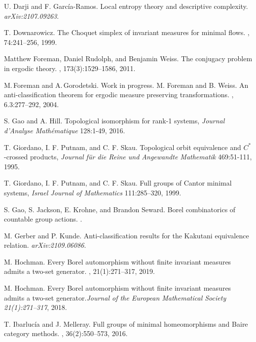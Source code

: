 \documentclass{article}
\theoremstyle{definition}
\begin{document}
\begin{thebibliography}{99}
 U. Darji and F. García-Ramos. Local entropy theory and descriptive complexity. {\em arXiv:2107.09263}.

 T. Downarowicz. 
\newblock The Choquet simplex of invariant measures for minimal flows. 
,
	74:241--256, 1999.
 
	Matthew Foreman, Daniel Rudolph, and Benjamin Weiss.
	\newblock The conjugacy problem in ergodic theory.
	, 173(3):1529--1586, 2011.

 M.\,Foreman and A.\,Gorodetski. Work in progress. 	
 M. Foreman and B. Weiss.
\newblock An anti-classification theorem for ergodic measure preserving transformations. 
,
	6.3:277--292, 2004.

S. Gao and A. Hill. Topological isomorphism for rank-1 systems, {\em Journal d'Analyse Math\'{e}matique} 128:1-49, 2016.

T. Giordano, I. F. Putnam, and C. F. Skau. Topological orbit equivalence and $C^*$-crossed products, {\em Journal f\"{u}r die Reine und Angewandte Mathematik} 469:51-111, 1995.

T. Giordano, I. F. Putnam, and C. F. Skau. Full groups of Cantor minimal systems, {\em Israel Journal of Mathematics} 111:285--320, 1999.


S. Gao, S. Jackson, E. Krohne, and Brandon Seward.
\newblock Borel combinatorics of countable group actions.
.

 M. Gerber and P. Kunde. Anti-classification results for the Kakutani equivalence relation. {\em arXiv:2109.06086}.

M. Hochman.
\newblock Every {B}orel automorphism without finite invariant measures admits a two-set generator.
, 21(1):271--317, 2019.
	
M. Hochman. Every Borel automorphism without finite invariant measures admits a two-set generator.{\em Journal of the European Mathematical Society 21(1):271–317}, 2018.

	T. Ibarluc{\'i}a and J. Melleray.
	\newblock Full groups of minimal homeomorphisms and {{Baire}} category methods.
	, 36(2):550--573,
	2016.


\end{thebibliography}
\end{document}
